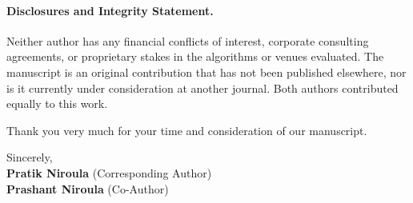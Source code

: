 \documentclass[11pt]{article}
\begin{document}
\paragraph{Disclosures and Integrity Statement.}
Neither author has any financial conflicts of interest, corporate consulting agreements, or proprietary stakes in the algorithms or venues evaluated. The manuscript is an original contribution that has not been published elsewhere, nor is it currently under consideration at another journal. Both authors contributed equally to this work.

Thank you very much for your time and consideration of our manuscript.

\vspace{1.5em}
\noindent
Sincerely, \\[1.0em]
\textbf{Pratik Niroula} (Corresponding Author) \\
\textbf{Prashant Niroula} (Co-Author)
\end{document}
